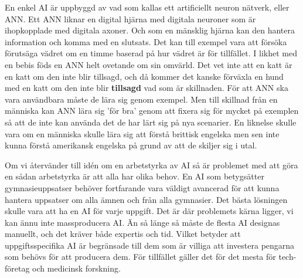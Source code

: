 \documentclass[a4paper,11pt, usenatbib]{article}
\begin{document}
En enkel AI är uppbyggd av vad som kallas ett artificiellt neuron nätverk, eller ANN. Ett ANN liknar en digital hjärna med digitala neuroner som är ihopkopplade med digitala axoner. Och som en mänsklig hjärna kan den hantera information och komma med en slutsats. Det kan till exempel vara att försöka förutsäga vädret om en timme baserad på hur vädret är för tillfället. I likhet med en bebis föds en ANN helt ovetande om sin omvärld. Det vet inte att en katt är en katt om den inte blir tillsagd, och då kommer det kanske förväxla en hund med en katt om den inte blir \textbf{tillsagd} vad som är skillnaden. För att ANN ska vara användbara måste de lära sig genom exempel. Men till skillnad från en människa kan ANN lära sig 'för bra' genom att fixera sig för mycket på exemplen så att de inte kan använda det de har lärt sig på nya scenarier. En liknelse skulle vara om en människa skulle lära sig att förstå brittisk engelska men sen inte kunna förstå amerikansk engelska på grund av att de skiljer sig i utal.


Om vi återvänder till idén om en arbetstyrka av AI så är problemet med att göra en sådan arbetstyrka är att alla har olika behov. En AI som betygsätter gymnasieuppsatser behöver fortfarande vara väldigt avancerad för att kunna hantera uppsatser om alla ämnen och från alla gymnasier. Det bästa lösningen skulle vara att ha en AI för varje uppgift. Det är där problemets kärna ligger, vi kan ännu inte massproducera AI. Än så länge så måste de flesta AI designas manuellt, och det kräver både expertis och tid. Vilket betyder att uppgiftsspecifika AI är begränsade till dem som är villiga att investera pengarna som behövs för att producera dem. För tillfället gäller det för det mesta för tech-företag och medicinsk forskning.

\end{document}
